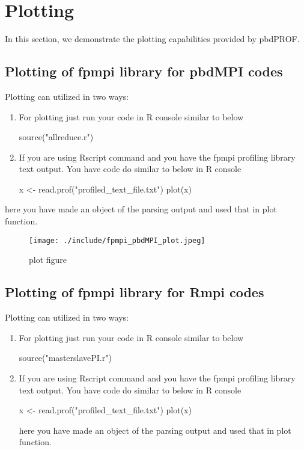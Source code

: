 \section{Plotting}
In this section, we demonstrate the plotting capabilities provided by pbdPROF.

\subsection{Plotting of fpmpi library for pbdMPI codes}
Plotting can utilized in two ways:
\begin{enumerate}
\item For plotting just run your code in R console similar to below 
\begin{Code}
source("allreduce.r")
\end{Code}
\item If you are using Rscript command and you have the fpmpi profiling library text output.
You have code do similar to below in R console
\begin{Code}
x <- read.prof("profiled_text_file.txt")
plot(x)
\end{Code}
\end{enumerate}
here you have made an object of the parsing output and used that in plot function.

\begin{figure}%
  \centering
  \texttt{[image: ./include/fpmpi\_pbdMPI\_plot.jpeg]}
  \caption{plot figure}
  \label{fig:plot_fpmpi}

\end{figure}


\subsection{Plotting of fpmpi library for Rmpi codes}
Plotting can utilized in two ways:
\begin{enumerate}
\item For plotting just run your code in R console similar to below 
\begin{Code}
source("masterslavePI.r")
\end{Code}
\item If you are using Rscript command and you have the fpmpi profiling library text output.
You have code do similar to below in R console
\begin{Code}
x <- read.prof("profiled_text_file.txt")
plot(x)
\end{Code}
here you have made an object of the parsing output and used that in plot function.
\end{enumerate}






